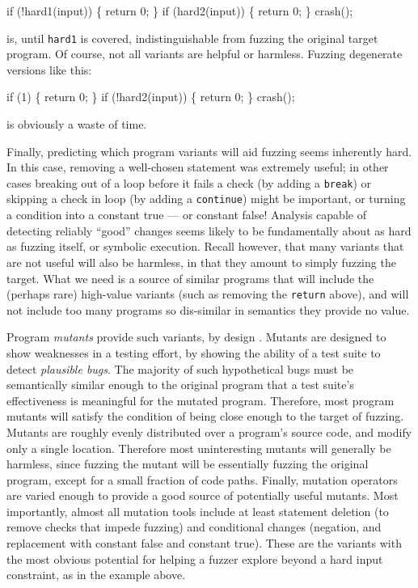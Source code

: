 \begin{code}
  if (!hard1(input)) \{
      return 0;
  \}
  if (hard2(input)) \{
      return 0;
  \}
  crash();
\end{code}

\noindent is, until {\tt hard1} is covered, indistinguishable from fuzzing the original target program.  Of course, not all variants are helpful or harmless.  Fuzzing degenerate versions like this:

\begin{code}
  if (1) \{
      return 0;
  \}
  if (!hard2(input)) \{
      return 0;
  \}
  crash();
\end{code}

\noindent is obviously a waste of time.


Finally, predicting which program variants will aid fuzzing seems
inherently hard.  In this case, removing a well-chosen statement was
extremely useful; in other cases breaking out of a loop before it
fails a check (by adding  a {\tt break}) or skipping a check in loop
(by adding a {\tt continue}) might be important, or turning a condition into a constant true --- or constant false!  Analysis capable of detecting reliably ``good'' changes seems likely to be fundamentally about as hard as fuzzing itself, or symbolic execution.  Recall however, that many variants that are not useful will also be harmless, in that they amount to simply fuzzing the target.  What we need is a source of similar programs that will include the (perhaps rare) high-value variants (such as removing the {\tt return} above), and will not include too many programs so dis-similar in semantics they provide no value.

Program \emph{mutants} provide such variants, by design \cite{MutationSurvey}.  Mutants are designed to show weaknesses in a testing effort, by showing
the ability of a test suite to detect \emph{plausible bugs}.  The majority of such hypothetical bugs must be semantically similar enough to
the original program that a test suite's effectiveness is meaningful for the mutated program.  Therefore, most program mutants
will satisfy the condition of being close enough to the target of fuzzing.  Mutants are roughly evenly distributed over a program's source code,
and modify only a single location.  Therefore most uninteresting mutants will generally be harmless, since fuzzing the mutant will be essentially
fuzzing the original program, except for a small fraction of code paths.  Finally, mutation operators are varied enough to provide a good source
of potentially useful mutants.  Most importantly, almost all mutation tools include at least statement deletion (to remove checks that impede
fuzzing) and conditional changes (negation, and replacement with constant false and constant true).  These are the variants with the most
obvious potential for helping a fuzzer explore beyond a hard input constraint, as in the example above.

